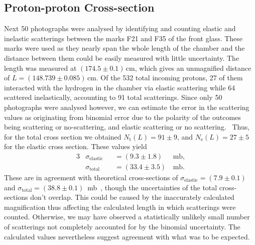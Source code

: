 \documentclass[twocolumn]{article}
\begin{document}
\subsection{Proton-proton Cross-section}
Next 50 photographs were analysed by identifying and counting elastic and inelastic scatterings between the marks F21 and F35 of the front glass. These marks were used as they nearly span the whole length of the chamber and the distance between them could be easily measured with little uncertainty. The length was measured at $(174.5 \pm 0.1)\,$cm, which gives an unmagnified distance of $L=(148.739 \pm 0.085)\,$cm. Of the 532 total incoming protons, 27 of them interacted with the hydrogen in the chamber via elastic scattering while 64 scattered inelastically, accounting to 91 total scatterings. Since only 50 photographs were analysed however, we can estimate the error in the scattering values as originating from binomial error due to the polarity of the outcomes being scattering or no-scattering, and elastic scattering or no scattering.~\cite{leo} Thus, for the total cross section we obtained %
$N_{\text{t}}(L) = 91 \pm 9$, and $N_{\text{e}}(L) = 27 \pm 5$ for the elastic cross section. These values yield
\begin{alignat*}{3}
&\sigma_{\text{elastic}} &&= (9.3 \pm 1.8) \, &\text{mb,}\\
&\sigma_{\text{total}} &&= (33.4 \pm 3.5) \, &\text{mb.} 
\end{alignat*}
These are in agreement with theoretical cross-sections of $\sigma_{\text{elastic}} = (7.9 \pm 0.1)$ and $ \sigma_{\text{total}} = (38.8 \pm 0.1) $~mb~\cite{seul2}, though the uncertainties of the total cross-sections don't overlap. This could be caused by the inaccurately calculated magnification thus affecting the calculated length in which scatterings were counted. Otherwise, we may have observed a statistically unlikely small number of scatterings not completely accounted for by the binomial uncertainty. The calculated values nevertheless suggest agreement with what was to be expected.
\end{document}
